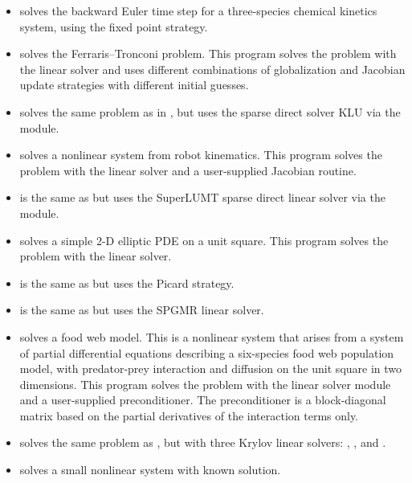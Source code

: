 \begin{itemize}
\item {}
  solves the backward Euler time step for a three-species chemical kinetics
  system, using the fixed point strategy.

\item {}
  solves the Ferraris--Tronconi problem.
  \newline
  This program solves the problem with the {\sunlinsoldense} linear solver
  and uses different combinations of globalization and Jacobian
  update strategies with different initial guesses.
\item {}
  solves the same problem as in , but uses the
  sparse direct solver KLU via the {\sunlinsolklu} module.

\item {}
  solves a nonlinear system from robot kinematics.
  \newline
  This program solves the problem with the {\sunlinsoldense} linear solver
  and a user-supplied Jacobian routine.
\item {}
  is the same as  but uses the SuperLUMT sparse direct
  linear solver via the {\sunlinsolslumt} module.

\item {}
  solves a simple 2-D elliptic PDE on a unit square.
 \newline
  This program solves the problem with the {\sunlinsolband} linear solver.
\item {}
  is the same as  but uses the Picard strategy.
\item {}
  is the same as  but uses the SPGMR linear solver.

\item {}
  solves a food web model.
  \newline
  This is a nonlinear system that arises from a system of partial
  differential equations describing a six-species food web population
  model, with predator-prey interaction and diffusion on the unit
  square in two dimensions.
  This program solves the problem with the {\sunlinsolspgmr} linear
  solver module and a user-supplied preconditioner. The preconditioner is a
  block-diagonal matrix based on the partial derivatives of the
  interaction terms only.
\item {}
  solves the same problem as , but with three Krylov
  linear solvers: {\sunlinsolspgmr}, {\sunlinsolspbcgs}, and {\sunlinsolsptfqmr}.

\item {} solves a small nonlinear system with known solution.
  
\end{itemize}


